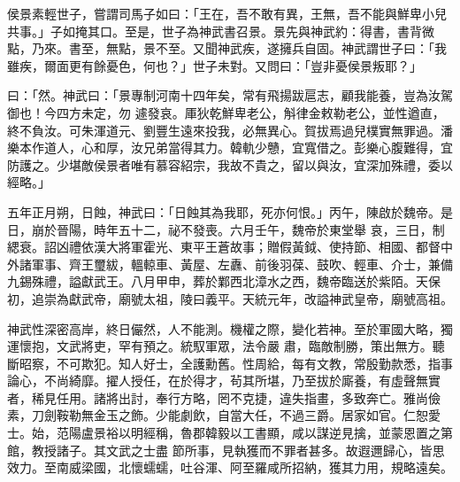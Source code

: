 \begin{pinyinscope}
 侯景素輕世子，嘗謂司馬子如曰：「王在，吾不敢有異，王無，吾不能與鮮卑小兒共事。」子如掩其口。至是，世子為神武書召景。景先與神武約：得書，書背微點，乃來。書至，無點，景不至。又聞神武疾，遂擁兵自固。神武謂世子曰：「我雖疾，爾面更有餘憂色，何也？」世子未對。又問曰：「豈非憂侯景叛耶？」



 曰：「然。神武曰：「景專制河南十四年矣，常有飛揚跋扈志，顧我能養，豈為汝駕御也！今四方未定，勿
 遽發哀。厙狄乾鮮卑老公，斛律金敕勒老公，並性遒直，終不負汝。可朱渾道元、劉豐生遠來投我，必無異心。賀拔焉過兒樸實無罪過。潘樂本作道人，心和厚，汝兄弟當得其力。韓軌少戇，宜寬借之。彭樂心腹難得，宜防護之。少堪敵侯景者唯有慕容紹宗，我故不貴之，留以與汝，宜深加殊禮，委以經略。」



 五年正月朔，日蝕，神武曰：「日蝕其為我耶，死亦何恨。」丙午，陳啟於魏帝。是日，崩於晉陽，時年五十二，祕不發喪。六月壬午，魏帝於東堂舉
 哀，三日，制緦衰。詔凶禮依漢大將軍霍光、東平王蒼故事；贈假黃鉞、使持節、相國、都督中外諸軍事、齊王璽紱，轀輬車、黃屋、左纛、前後羽葆、鼓吹、輕車、介士，兼備九錫殊禮，謚獻武王。八月甲申，葬於鄴西北漳水之西，魏帝臨送於紫陌。天保初，追崇為獻武帝，廟號太祖，陵曰義平。天統元年，改謚神武皇帝，廟號高祖。



 神武性深密高岸，終日儼然，人不能測。機權之際，變化若神。至於軍國大略，獨運懷抱，文武將吏，罕有預之。統馭軍眾，法令嚴
 肅，臨敵制勝，策出無方。聽斷昭察，不可欺犯。知人好士，全護勳舊。性周給，每有文教，常殷勤款悉，指事論心，不尚綺靡。擢人授任，在於得才，茍其所堪，乃至拔於廝養，有虛聲無實者，稀見任用。諸將出討，奉行方略，罔不克捷，違失指畫，多致奔亡。雅尚儉素，刀劍鞍勒無金玉之飾。少能劇飲，自當大任，不過三爵。居家如官。仁恕愛士。始，范陽盧景裕以明經稱，魯郡韓毅以工書顯，咸以謀逆見擒，並蒙恩置之第館，教授諸子。其文武之士盡
 節所事，見執獲而不罪者甚多。故遐邇歸心，皆思效力。至南威梁國，北懷蠕蠕，吐谷渾、阿至羅咸所招納，獲其力用，規略遠矣。



\end{pinyinscope}